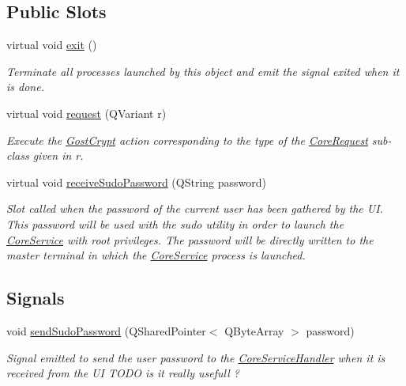 \subsection*{Public Slots}
\begin{DoxyCompactItemize}
\item 
virtual void \hyperlink{class_gost_crypt_1_1_core_1_1_core_user_a4833f12f92b816dfb81c47b40eaf58d0}{exit} ()
\begin{DoxyCompactList}\small\item\em Terminate all processes launched by this object and emit the signal exited when it is done. \end{DoxyCompactList}\item 
virtual void \hyperlink{class_gost_crypt_1_1_core_1_1_core_user_a91a25e3438a7e4d60f35b099a99645a6}{request} (Q\+Variant r)
\begin{DoxyCompactList}\small\item\em Execute the \hyperlink{namespace_gost_crypt}{Gost\+Crypt} action corresponding to the type of the \hyperlink{struct_gost_crypt_1_1_core_1_1_core_request}{Core\+Request} sub-\/class given in r. \end{DoxyCompactList}\item 
virtual void \hyperlink{class_gost_crypt_1_1_core_1_1_core_user_a3c07e2095c168016506b1cfe7b165031}{receive\+Sudo\+Password} (Q\+String password)
\begin{DoxyCompactList}\small\item\em Slot called when the password of the current user has been gathered by the UI. This password will be used with the sudo utility in order to launch the \hyperlink{class_gost_crypt_1_1_core_1_1_core_service}{Core\+Service} with root privileges. The password will be directly written to the master terminal in which the \hyperlink{class_gost_crypt_1_1_core_1_1_core_service}{Core\+Service} process is launched. \end{DoxyCompactList}\end{DoxyCompactItemize}
\subsection*{Signals}
\begin{DoxyCompactItemize}
\item 
void \hyperlink{class_gost_crypt_1_1_core_1_1_core_user_a3932d033fc64fc3e6a70f836e569f111}{send\+Sudo\+Password} (Q\+Shared\+Pointer$<$ Q\+Byte\+Array $>$ password)
\begin{DoxyCompactList}\small\item\em Signal emitted to send the user password to the \hyperlink{class_gost_crypt_1_1_core_1_1_core_service_handler}{Core\+Service\+Handler} when it is received from the UI T\+O\+DO is it really usefull ? \end{DoxyCompactList}\end{DoxyCompactItemize}
